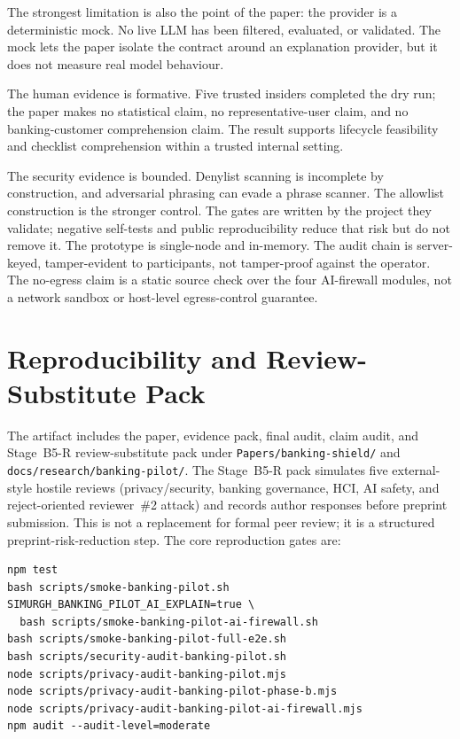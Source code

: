 \documentclass[conference]{IEEEtran}
\begin{document}
The strongest limitation is also the point of the paper: the provider is a
deterministic mock. No live LLM has been filtered, evaluated, or validated. The
mock lets the paper isolate the contract around an explanation provider, but it
does not measure real model behaviour.

The human evidence is formative. Five trusted insiders completed the dry run; the
paper makes no statistical claim, no representative-user claim, and no
banking-customer comprehension claim. The result supports lifecycle feasibility
and checklist comprehension within a trusted internal setting.

The security evidence is bounded. Denylist scanning is incomplete by
construction, and adversarial phrasing can evade a phrase scanner. The allowlist
construction is the stronger control. The gates are written by the project they
validate; negative self-tests and public reproducibility reduce that risk but do
not remove it. The prototype is single-node and in-memory. The audit chain is
server-keyed, tamper-evident to participants, not tamper-proof against the
operator. The no-egress claim is a static source check over the four AI-firewall
modules, not a network sandbox or host-level egress-control guarantee.

\section{Reproducibility and Review-Substitute Pack}

The artifact includes the paper, evidence pack, final audit, claim audit, and
Stage~B5-R review-substitute pack under \texttt{Papers/banking-shield/} and
\texttt{docs/research/banking-pilot/}. The Stage~B5-R pack simulates five
external-style hostile reviews (privacy/security, banking governance, HCI, AI
safety, and reject-oriented reviewer~\#2 attack) and records author responses
before preprint submission. This is not a replacement for formal peer review; it
is a structured preprint-risk-reduction step. The core reproduction gates are:

{\scriptsize
\begin{verbatim}
npm test
bash scripts/smoke-banking-pilot.sh
SIMURGH_BANKING_PILOT_AI_EXPLAIN=true \
  bash scripts/smoke-banking-pilot-ai-firewall.sh
bash scripts/smoke-banking-pilot-full-e2e.sh
bash scripts/security-audit-banking-pilot.sh
node scripts/privacy-audit-banking-pilot.mjs
node scripts/privacy-audit-banking-pilot-phase-b.mjs
node scripts/privacy-audit-banking-pilot-ai-firewall.mjs
npm audit --audit-level=moderate
\end{verbatim}
}
\end{document}
